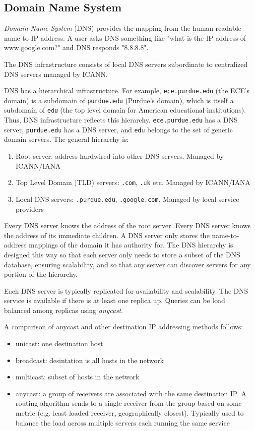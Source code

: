 \subsection{Domain Name System}

\emph{Domain Name System} (DNS) provides the mapping from the
human-readable name to IP address. A user asks DNS something
like "what is the IP address of www.google.com?" and DNS
responds "8.8.8.8".

The DNS infrastructure consists of local DNS servers
subordinate to centralized DNS servers managed by ICANN.

DNS has a hierarchical infrastructure. For example,
\texttt{ece.purdue.edu} (the ECE's domain) is a
subdomain of \texttt{purdue.edu} (Purdue's domain),
which is itself a subdomain of \texttt{edu} (the top level
domain for American educational institutions). Thus,
DNS infrastructure reflects this hierarchy. \texttt{ece.purdue.edu}
has a DNS server, \texttt{purdue.edu} has a DNS server,
and \texttt{edu} belongs to the set of generic domain servers.
The general hierarchy is:
\begin{enumerate}
    \item Root server: address hardwired into other DNS servers. Managed by ICANN/IANA
    \item Top Level Domain (TLD) servers: \texttt{.com}, \texttt{.uk} etc. Managed by ICANN/IANA
    \item Local DNS servers: \texttt{.purdue.edu}, \texttt{.google.com}. Managed by local service providers
\end{enumerate}

Every DNS server knows the address of the root server. Every DNS server
knows the address of its immediate children. A DNS server only stores the
name-to-address mappings of the domain it has authority for.
The DNS hierarchy is designed this way so that each server only
needs to store a subset of the DNS database, ensuring scalability, and
so that any server can discover servers for any portion of the hierarchy.

Each DNS server is typically replicated for availability and scalability.
The DNS service is available if there is at least one replica up.
Queries can be load balanced among replicas using \emph{anycast}.

A comparison of anycast and other destination IP addressing methods
follows:
\begin{itemize}
    \item unicast: one destination host
    \item broadcast: desintation is all hosts in the network
    \item multicast: subset of hosts in the network
    \item anycast: a group of receivers are associated with the
          same destination IP. A routing algorithm sends to a single
          receiver from the group based on some metric (e.g. least
          loaded receiver, geographically closest). Typically used to
          balance the load across multiple servers each running the
          same service
\end{itemize}

